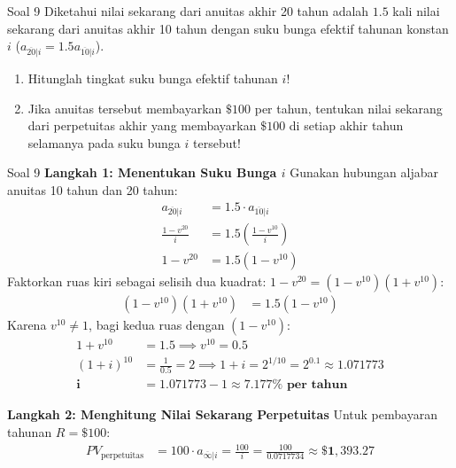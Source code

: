 \documentclass[11pt,a4paper]{article}
\begin{document}
\vspace{1.5em}

\begin{problembox}{Soal 9}
Diketahui nilai sekarang dari anuitas akhir 20 tahun adalah $1.5$ kali nilai sekarang dari anuitas akhir 10 tahun dengan suku bunga efektif tahunan konstan $i$ ($a_{\overline{20}|i} = 1.5 a_{\overline{10}|i}$).
\begin{enumerate}[label=(\alph*)]
    \item Hitunglah tingkat suku bunga efektif tahunan $i$!
    \item Jika anuitas tersebut membayarkan $\$100$ per tahun, tentukan nilai sekarang dari perpetuitas akhir yang membayarkan $\$100$ di setiap akhir tahun selamanya pada suku bunga $i$ tersebut!
\end{enumerate}
\end{problembox}

\begin{solutionbox}{Soal 9}
\textbf{Langkah 1: Menentukan Suku Bunga $i$}
Gunakan hubungan aljabar anuitas 10 tahun dan 20 tahun:
\begin{align*}
    a_{\overline{20}|i} &= 1.5 \cdot a_{\overline{10}|i} \\[0.4em]
    \frac{1 - v^{20}}{i} &= 1.5 \left(\frac{1 - v^{10}}{i}\right) \\[0.4em]
    1 - v^{20} &= 1.5 (1 - v^{10})
\end{align*}
Faktorkan ruas kiri sebagai selisih dua kuadrat: $1 - v^{20} = (1 - v^{10})(1 + v^{10})$:
\begin{align*}
    (1 - v^{10})(1 + v^{10}) &= 1.5 (1 - v^{10})
\end{align*}
Karena $v^{10} \neq 1$, bagi kedua ruas dengan $(1 - v^{10})$:
\begin{align*}
    1 + v^{10} &= 1.5 \implies v^{10} = 0.5 \\[0.4em]
    (1+i)^{10} &= \frac{1}{0.5} = 2 \implies 1 + i = 2^{1/10} = 2^{0.1} \approx 1.071773 \\[0.4em]
    \mathbf{i} &= 1.071773 - 1 \approx \mathbf{7.177\% \text{ per tahun}}
\end{align*}

\textbf{Langkah 2: Menghitung Nilai Sekarang Perpetuitas}
Untuk pembayaran tahunan $R = \$100$:
\begin{align*}
    PV_{\text{perpetuitas}} &= 100 \cdot a_{\overline{\infty}|i} = \frac{100}{i} = \frac{100}{0.0717734} \approx \mathbf{\$1{,}393.27}
\end{align*}
\end{solutionbox}
\end{document}

